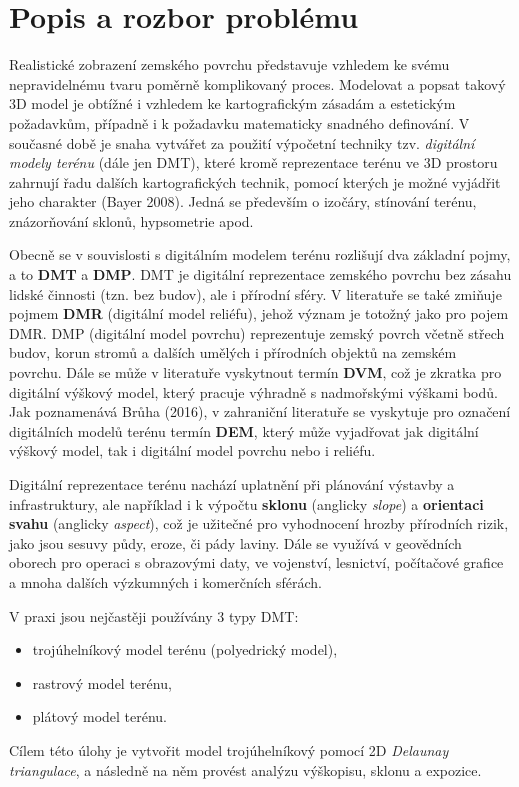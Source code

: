 \chapter*{Popis a rozbor problému}

\par Realistické zobrazení zemského povrchu představuje vzhledem ke svému nepravidelnému tvaru poměrně komplikovaný proces. Modelovat a popsat takový 3D model je obtížné i vzhledem ke kartografickým zásadám a estetickým požadavkům, případně i k požadavku matematicky snadného definování. V současné době je snaha vytvářet za použití výpočetní techniky tzv. \emph{digitální modely terénu} (dále jen DMT), které kromě reprezentace terénu ve 3D prostoru zahrnují řadu dalších kartografických technik, pomocí kterých je možné vyjádřit jeho charakter (Bayer 2008). Jedná se především o izočáry, stínování terénu, znázorňování sklonů, hypsometrie apod.
\par Obecně se v souvislosti s digitálním modelem terénu rozlišují dva základní pojmy, a to \textbf{DMT} a \textbf{DMP}. DMT je digitální reprezentace zemského povrchu bez zásahu lidské činnosti (tzn. bez budov), ale i přírodní sféry. V literatuře se také zmiňuje pojmem \textbf{DMR} (digitální model reliéfu), jehož význam je totožný jako pro pojem DMR.  DMP (digitální model povrchu) reprezentuje zemský povrch včetně střech budov, korun stromů a dalších umělých i přírodních objektů na zemském povrchu. Dále se může v literatuře vyskytnout termín \textbf{DVM}, což je zkratka pro digitální výškový model, který pracuje výhradně s nadmořskými výškami bodů. Jak poznamenává Brůha (2016), v zahraniční literatuře se vyskytuje pro označení digitálních modelů terénu termín \textbf{DEM}, který může vyjadřovat jak digitální výškový model, tak i digitální model povrchu nebo i reliéfu.
\par Digitální reprezentace terénu nachází uplatnění při plánování výstavby a infrastruktury, ale například i k výpočtu \textbf{sklonu} (anglicky \emph{slope}) a \textbf{orientaci svahu} (anglicky \emph{aspect}), což je užitečné pro vyhodnocení hrozby přírodních rizik, jako jsou sesuvy půdy, eroze, či pády laviny. Dále se využívá v geovědních oborech pro operaci s obrazovými daty, ve vojenství, lesnictví, počítačové grafice a mnoha dalších výzkumných i komerčních sférách.
\par V praxi jsou nejčastěji používány 3 typy DMT:
\begin{itemize}
    \item trojúhelníkový model terénu (polyedrický model),
    \item rastrový model terénu,
    \item plátový model terénu.
\end{itemize}
\par Cílem této úlohy je vytvořit model trojúhelníkový pomocí 2D \emph{Delaunay triangulace}, a následně na něm provést analýzu výškopisu, sklonu a expozice.

